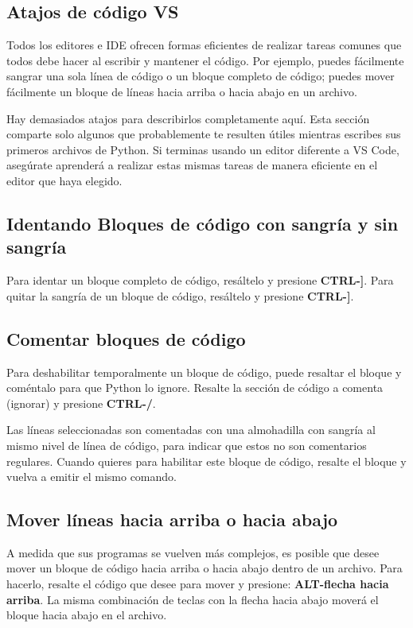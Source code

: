 \subsection{Atajos de código VS}

Todos los editores e IDE ofrecen formas eficientes de realizar tareas comunes que todos
debe hacer al escribir y mantener el código. Por ejemplo, puedes fácilmente
sangrar una sola línea de código o un bloque completo de código; puedes mover fácilmente un bloque de líneas hacia arriba o hacia
abajo en un archivo.

Hay demasiados atajos para describirlos completamente aquí. Esta sección
comparte solo algunos que probablemente te resulten útiles mientras escribes sus primeros
archivos de Python. Si terminas usando un editor diferente a VS Code, asegúrate
aprenderá a realizar estas mismas tareas de manera eficiente en el editor que haya elegido.

\subsection{Identando Bloques de código con sangría y sin sangría}

Para identar un bloque completo de código, resáltelo y presione {\bf\scriptsize CTRL-]}. 
Para quitar la sangría de un bloque de código, resáltelo y presione {\bf\scriptsize CTRL-]}.

\subsection{Comentar bloques de código}

Para deshabilitar temporalmente un bloque de código, puede resaltar el bloque y
coméntalo para que Python lo ignore. Resalte la sección de código a comenta (ignorar) y presione  {\bf\scriptsize CTRL-/}. 

Las líneas seleccionadas son comentadas con una almohadilla  {\ttfamily {\#}} con sangría al mismo nivel de
línea de código, para indicar que estos no son comentarios regulares. Cuando quieres
para habilitar este bloque de código, resalte el bloque y vuelva a emitir el mismo comando.

\subsection{Mover líneas hacia arriba o hacia abajo} 

A medida que sus programas se vuelven más complejos, es posible que desee mover un
bloque de código hacia arriba o hacia abajo dentro de un archivo. Para hacerlo, resalte el código que desee
para mover y presione: {\bf {}\scriptsize ALT-flecha hacia arriba}. La misma  combinación de teclas con la flecha hacia abajo
moverá el bloque hacia abajo en el archivo.


